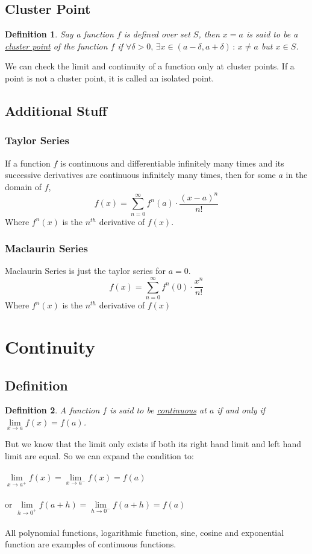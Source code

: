 \documentclass[14]{article}
\newtheorem{define}{Definition}
\begin{document}
\subsection{Cluster Point}
\begin{define}
Say a function $f$ is defined over set $S$, then $x = a$ is said to be a \underline{cluster point} of the function $f$ if $\forall \delta > 0,\, \exists x \in (a - \delta, a + \delta)\, : \, x \neq a$ but $x \in S$.
\end{define}
We can check the limit and continuity of a function only at cluster points. If a point is not a cluster point, it is called an isolated point.
\subsection{Additional Stuff}
\subsubsection{Taylor Series}
If a function $f$ is continuous and differentiable infinitely many times and its successive derivatives are continuous infinitely many times, then for some $a$ in the domain of $f$,\\
$$f(x) = \sum\limits_{n=0}^{\infty} f^n(a) \cdot \dfrac{{(x-a)^n}}{n!}$$
Where $f^n(x)$ is the $n^{th}$ derivative of $f(x)$.
\subsubsection{Maclaurin Series}
Maclaurin Series is just the taylor series for $a = 0$.\\
$$f(x) = \sum\limits_{n=0}^{\infty} f^n(0) \cdot \dfrac{x^n}{n!}$$
Where $f^n(x)$ is the $n^{th}$ derivative of $f(x)$
\pagebreak
\section{Continuity}
\subsection{Definition}
\begin{define}
A function $f$ is said to be \underline{continuous} at $a$ if and only if $\lim\limits_{x \to a} f(x) = f(a)$.
\end{define}
But we know that the limit only exists if both its right hand limit and left hand limit are equal.
So we can expand the condition to:\\\\
$\lim\limits_{x \to a^+} f(x) = \lim\limits_{x \to a^-} f(x) = f(a)$\\\\
or $\lim\limits_{h \to 0^+} f(a+h) = \lim\limits_{h \to 0^-} f(a+h) = f(a)$\\\\
All polynomial functions, logarithmic function, sine, cosine and exponential function are examples of continuous functions.
\end{document}
